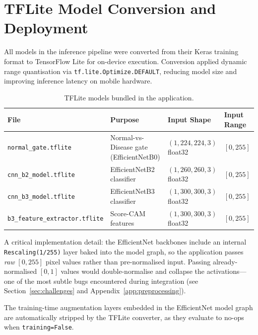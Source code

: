 \section{TFLite Model Conversion and Deployment}
\label{sec:tflite}

All models in the inference pipeline were converted from their Keras training format to TensorFlow Lite for on-device execution. Conversion applied dynamic range quantisation via \texttt{tf.lite.Optimize.DEFAULT}, reducing model size and improving inference latency on mobile hardware.

\begin{table}[H]
\centering
\caption{TFLite models bundled in the application.}
\label{tab:tflite_models}
\begin{tabular}{|l|l|l|l|}
\hline
\textbf{File} & \textbf{Purpose} & \textbf{Input Shape} & \textbf{Input Range} \\ \hline
\texttt{normal\_gate.tflite} & Normal-vs-Disease gate (EfficientNetB0) & $(1, 224, 224, 3)$ float32 & $[0, 255]$ \\ \hline
\texttt{cnn\_b2\_model.tflite} & EfficientNetB2 classifier & $(1, 260, 260, 3)$ float32 & $[0, 255]$ \\ \hline
\texttt{cnn\_b3\_model.tflite} & EfficientNetB3 classifier & $(1, 300, 300, 3)$ float32 & $[0, 255]$ \\ \hline
\texttt{b3\_feature\_extractor.tflite} & Score-CAM features & $(1, 300, 300, 3)$ float32 & $[0, 255]$ \\ \hline
\end{tabular}
\end{table}

A critical implementation detail: the EfficientNet backbones include an internal \texttt{Rescaling(1/255)} layer baked into the model graph, so the application passes \textit{raw} $[0, 255]$ pixel values rather than pre-normalised input. Passing already-normalised $[0, 1]$ values would double-normalise and collapse the activations---one of the most subtle bugs encountered during integration (see Section~\ref{sec:challenges} and Appendix~\ref{app:preprocessing}).

The training-time augmentation layers embedded in the EfficientNet model graph are automatically stripped by the TFLite converter, as they evaluate to no-ops when \texttt{training=False}.


